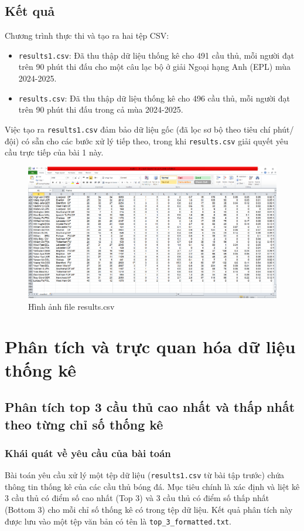 \documentclass[12pt, a4paper]{report}
\begin{document}
\section{Kết quả}
Chương trình thực thi và tạo ra hai tệp CSV: 
\begin{itemize}
\renewcommand{\labelitemi}{}
    \item \texttt{results1.csv}: Đã thu thập dữ liệu thống kê cho 491 cầu thủ, mỗi người đạt trên 90 phút thi đấu cho một câu lạc bộ ở giải Ngoại hạng Anh (EPL) mùa 2024-2025. 
    \item \texttt{results.csv}: Đã thu thập dữ liệu thống kê cho 496 cầu thủ, mỗi người đạt trên 90 phút thi đấu trong cả mùa 2024-2025. 
\end{itemize}
Việc tạo ra \texttt{results1.csv} đảm bảo dữ liệu gốc (đã lọc sơ bộ theo tiêu chí phút/đội) có sẵn cho các bước xử lý tiếp theo, trong khi \texttt{results.csv} giải quyết yêu cầu trực tiếp của bài 1 này.  

\begin{figure}[h]
    \centering
    \includegraphics[width=\textwidth]{results.png}
    \caption{Hình ảnh file results.csv}
    \label{fig:results.csv}
\end{figure}

\chapter{Phân tích và trực quan hóa dữ liệu thống kê}

\section{Phân tích top 3 cầu thủ cao nhất và thấp nhất theo từng chỉ số thống kê}

\subsection{Khái quát về yêu cầu của bài toán}
Bài toán yêu cầu xử lý một tệp dữ liệu (\texttt{results1.csv} từ bài tập trước) chứa thông tin thống kê của các cầu thủ bóng đá.
Mục tiêu chính là xác định và liệt kê 3 cầu thủ có điểm số cao nhất (Top 3) và 3 cầu thủ có điểm số thấp nhất (Bottom 3) cho mỗi chỉ số thống kê có trong tệp dữ liệu.
Kết quả phân tích này được lưu vào một tệp văn bản có tên là \texttt{top\_3\_formatted.txt}.
\end{document}
